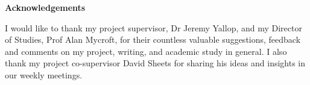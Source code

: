 \newpage
{\Huge \bf Acknowledgements}
\vspace{24pt} 

I would like to thank my project supervisor, Dr Jeremy Yallop, and my Director of Studies, Prof Alan Mycroft, for their countless valuable suggestions, feedback and comments on my project, writing, and academic study in general. I also thank my project co-supervisor David Sheets for sharing his ideas and insights in our weekly meetings.

\newpage